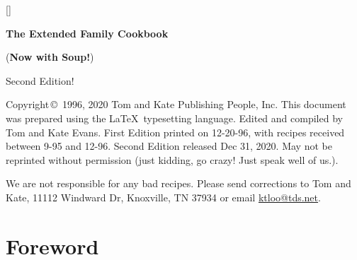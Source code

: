\documentclass[12pt]{article}
\begin{document}
[]

\begin{titlepage}
\vspace*{1.5in}
\begin{center}
\begin{Huge}
\vspace{2\baselineskip}
{\bf The Extended Family Cookbook}\\
\end{Huge}
\begin{huge}
\vspace{\baselineskip}
({\bf Now with Soup!})\\
\end{huge}
\begin{LARGE}
\vspace{3\baselineskip}
Second Edition!
\end{LARGE}
\end{center}
\end{titlepage}

\vspace*{\fill}
Copyright\,\copyright\, 1996, 2020 Tom and Kate Publishing People, Inc. This
document was prepared using the \LaTeX\ typesetting language. Edited and
compiled by Tom and Kate Evans. First Edition printed on 12-20-96, with recipes
received between 9-95 and 12-96. Second Edition released Dec 31, 2020. May not
be reprinted without permission (just kidding, go crazy! Just speak well of
us.).

\vspace{1\baselineskip}
We are not responsible for any bad recipes. Please send corrections to Tom and
Kate, 11112 Windward Dr, Knoxville, TN 37934 or email
\href{mailto:ktloo@tds.net}{ktloo@tds.net}.
\pagebreak

\pagestyle{headings}
\tableofcontents

\clearpage
\thispagestyle{plain}
{}
\section*{Foreword}
\end{document}
